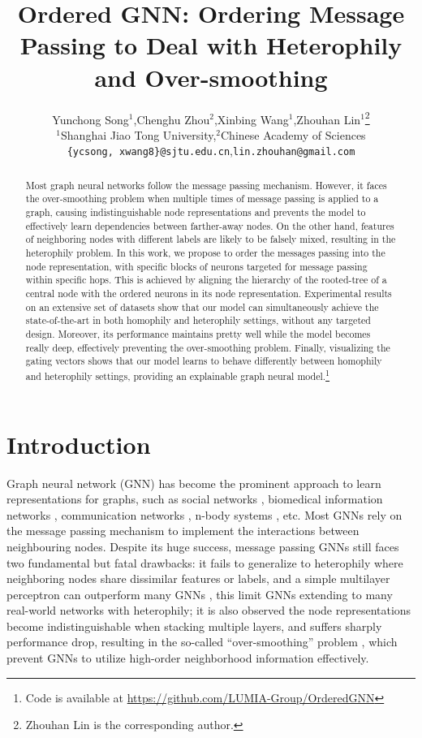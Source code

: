 \documentclass{article}
\title{Ordered GNN: Ordering Message Passing to Deal with Heterophily and Over-smoothing}
\author{Yunchong Song$^{1}$,\quad Chenghu Zhou$^{2}$,\quad Xinbing Wang$^{1}$,\quad Zhouhan Lin$^{1}$\thanks{Zhouhan Lin is the corresponding author.}\\
$^{1}$Shanghai Jiao Tong University,\quad $^{2}$Chinese Academy of Sciences\\
\texttt{\{ycsong, xwang8\}@sjtu.edu.cn},\quad \texttt{lin.zhouhan@gmail.com}\\
}
\begin{document}
\maketitle

\begin{abstract}
Most graph neural networks follow the message passing mechanism. However, it faces the over-smoothing problem when multiple times of message passing is applied to a graph, causing indistinguishable node representations and prevents the model to effectively learn dependencies between farther-away nodes. On the other hand, features of neighboring nodes with different labels are likely to be falsely mixed, resulting in the heterophily problem.
In this work, we propose to order the messages passing into the node representation, with specific blocks of neurons targeted for message passing within specific hops. This is achieved by aligning the hierarchy of the rooted-tree of a central node with the ordered neurons in its node representation.
Experimental results on an extensive set of datasets show that our model can simultaneously achieve the state-of-the-art in both homophily and heterophily settings, without any targeted design. Moreover, its performance maintains pretty well while the model becomes really deep, effectively preventing the over-smoothing problem. Finally, visualizing the gating vectors shows that our model learns to behave differently between homophily and heterophily settings, providing an explainable graph neural model.\footnote{Code is available at \url{https://github.com/LUMIA-Group/OrderedGNN}}

\end{abstract}

\section{Introduction}

Graph neural network (GNN) \citep{scarselli2008graph,bruna2013spectral,defferrard2016convolutional,kipf2016semi,velivckovic2017graph,hamilton2017inductive,gilmer2017neural,xu2018powerful} has become the prominent approach to learn representations for graphs, such as social networks \citep{li2019encoding}, biomedical information networks \citep{yan2019groupinn}, communication networks \citep{suarez2021graph}, n-body systems \citep{kipf2018neural}, etc. Most GNNs rely on the message passing mechanism \citep{gilmer2017neural} to implement the interactions between neighbouring nodes. Despite its huge success, message passing GNNs still faces two fundamental but fatal drawbacks: it fails to generalize to heterophily where neighboring nodes share dissimilar features or labels, and a simple multilayer perceptron can outperform many GNNs \citep{zhu2020beyond}, this limit GNNs extending to many real-world networks with heterophily;
it is also observed the node representations become indistinguishable when stacking multiple layers, and suffers sharply performance drop, resulting in the so-called ``over-smoothing'' problem \citep{li2018deeper}, which prevent GNNs to utilize high-order neighborhood information effectively.
\end{document}

